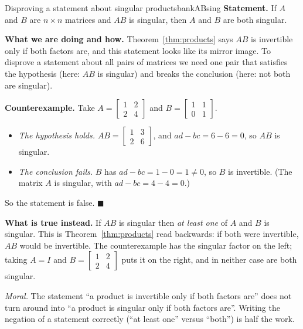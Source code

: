 \documentclass[11pt]{article}
\begin{document}
\begin{exmp}{Disproving a statement about singular products}{bankABsing}
\textbf{Statement.} If $A$ and $B$ are $n\times n$ matrices and $AB$ is singular, then $A$ and $B$ are both singular.

\textbf{What we are doing and how.} Theorem~\ref{thm:products} says $AB$ is invertible only if both factors are, and this statement looks like its mirror image. To disprove a statement about all pairs of matrices we need one pair that satisfies the hypothesis (here: $AB$ is singular) and breaks the conclusion (here: not both are singular).

\textbf{Counterexample.} Take $A=\begin{bmatrix}1&2\\2&4\end{bmatrix}$ and $B=\begin{bmatrix}1&1\\0&1\end{bmatrix}$.
\begin{itemize}
  \item \emph{The hypothesis holds.} $AB=\begin{bmatrix}1&3\\2&6\end{bmatrix}$, and $ad-bc=6-6=0$, so $AB$ is singular.
  \item \emph{The conclusion fails.} $B$ has $ad-bc=1-0=1\neq0$, so $B$ is invertible. (The matrix $A$ is singular, with $ad-bc=4-4=0$.)
\end{itemize}
So the statement is false. \qquad$\blacksquare$

\textbf{What is true instead.} If $AB$ is singular then \emph{at least one} of $A$ and $B$ is singular. This is Theorem~\ref{thm:products} read backwards: if both were invertible, $AB$ would be invertible. The counterexample has the singular factor on the left; taking $A=I$ and $B=\begin{bmatrix}1&2\\2&4\end{bmatrix}$ puts it on the right, and in neither case are both singular.

\emph{Moral.} The statement ``a product is invertible only if both factors are'' does not turn around into ``a product is singular only if both factors are''. Writing the negation of a statement correctly (``at least one'' versus ``both'') is half the work.
\end{exmp}
\end{document}
